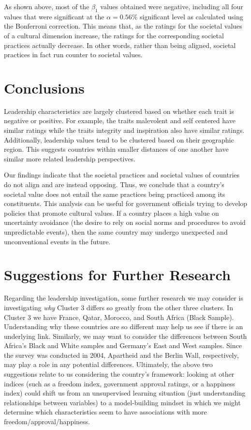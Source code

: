 \documentclass[
]{article}
\begin{document}
As shown above, most of the \(\beta_1\) values obtained were negative,
including all four values that were significant at the
\(\alpha = 0.56\)\% significant level as calculated using the Bonferroni
correction. This means that, as the ratings for the societal values of a
cultural dimension increase, the ratings for the corresponding societal
practices actually decrease. In other words, rather than being aligned,
societal practices in fact run counter to societal values.

\hypertarget{conclusions}{%
\section{Conclusions}\label{conclusions}}

Leadership characteristics are largely clustered based on whether each
trait is negative or positive. For example, the traits malevolent and
self centered have similar ratings while the traits integrity and
inspiration also have similar ratings. Additionally, leadership values
tend to be clustered based on their geographic region. This suggests
countries within smaller distances of one another have similar more
related leadership perspectives.

Our findings indicate that the societal practices and societal values of
countries do not align and are instead opposing. Thus, we conclude that
a country's societal value does not entail the same practices being
practiced among its constituents. This analysis can be useful for
government officials trying to develop policies that promote cultural
values. If a country places a high value on uncertainty avoidance (the
desire to rely on social norms and procedures to avoid unpredictable
events), then the same country may undergo unexpected and unconventional
events in the future.

\hypertarget{suggestions-for-further-research}{%
\section{Suggestions for Further
Research}\label{suggestions-for-further-research}}

Regarding the leadership investigation, some further research we may
consider is investigating \emph{why} Cluster 3 differs so greatly from
the other three clusters. In Cluster 3 we have France, Qatar, Morocco,
and South Africa (Black Sample). Understanding why these countries are
so different may help us see if there is an underlying link. Similarly,
we may want to consider the differences between South Africa's Black and
White samples and Germany's East and West samples. Since the survey was
conducted in 2004, Apartheid and the Berlin Wall, respectively, may play
a role in any potential differences. Ultimately, the above two
suggestions relate to us considering the country's framework: looking at
other indices (such as a freedom index, government approval ratings, or
a happiness index) could shift us from an unsupervised learning
situation (just understanding relationships between variables) to a
model-building mindset in which we might determine which characteristics
seem to have associations with more freedom/approval/happiness.
\end{document}
